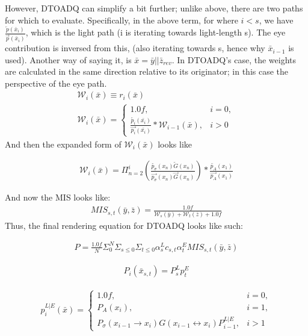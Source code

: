 \message{ !name(test.tex)}\documentclass{article}
\begin{document}
    However, DTOADQ can simplify a bit further; unlike above, there are two
    paths for which to evaluate. Specifically, in the above term, for where
    $i < s$, we have
    $\frac{\overleftarrow{p}(\bar{x}_i)}{\overrightarrow{p}(\bar{x}_i)}$, 
    which is the light path (i is iterating towards light-length s). The eye
    contribution is inversed from this, (also iterating towards s, hence why
    $\bar{x}_{i-1}$ is used). Another way of saying it, is $\bar{x} = \bar{y} ||
    \bar{z}_{rev}$.
    In DTOADQ's case, the weights are calculated in
    the same direction relative to its originator; in this case the perspective
    of the eye path.
  \begin{align}
    \mathcal{W}_i(\bar{x}) \equiv r_i(\bar{x})\\
    \mathcal{W}_i (\bar{x}) = 
    \begin{cases}
      1.0f, & i = 0,\\
      \frac{\overleftarrow{p_i}(\bar{x_i})}{\overrightarrow{p_i}(\bar{x_i})} *
      \mathcal{W}_{i-1}(\bar{x}), & i > 0
    \end{cases}
  \end{align}
    And then the expanded form of $\mathcal{W}_i(\bar{x})$ looks like

  \begin{align}
    \mathcal{W}_i(\bar{x}) = \Pi_{n=2}^i(\frac{\overleftarrow
    {p_{\sigma}}(x_n)\overleftarrow {G}(x_n)}
    {\overrightarrow{p_{\sigma}}(x_n)\overrightarrow{G}(x_n)})
    * \frac{\overleftarrow{p_A}(x_1)}{\overrightarrow{p_A}(x_1)}
  \end{align}
 
    And now the MIS looks like:
  \begin{align}
    MIS_{s, t}(\bar{y}, \bar{z}) =
    \frac{1.0f}{\mathcal{W}_s(\bar{y}) + \mathcal{W}_t(\bar{z}) + 1.0f}
  \end{align}
    Thus, the final rendering equation for DTOADQ looks like such:

  \begin{align}
    P = \frac{1.0f}{N} \Sigma_{0}^{N} \Sigma_{s \le 0} \Sigma_{t \le 0}
    \alpha^L_s c_{s,t} \alpha^E_t MIS_{s, t}(\bar{y}, \bar{z})
  \end{align}


  \begin{align}
    P_i(\bar{x}_{s, t}) = P^L_s p^E_t
  \end{align}

  \begin{align}
    p^{L|E}_i(\bar{x}) =
    \begin{cases}
      1.0f, & i = 0,\\
      P_A(x_i), & i = 1,\\
      P_{\sigma}(x_{i-1} \rightarrow x_i) G(x_{i-1} \leftrightarrow x_i)
      P^{L|E}_{i-1}, & i > 1
    \end{cases}
  \end{align}
\end{document}
